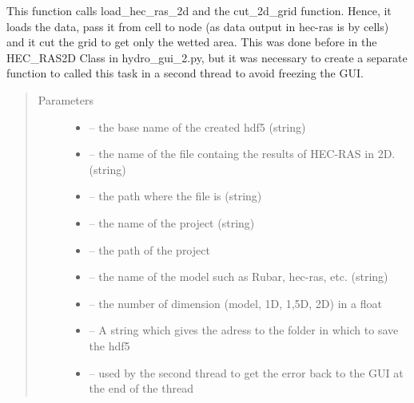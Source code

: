 \documentclass[letterpaper,10pt,english]{sphinxmanual}
\begin{document}
\begin{fulllineitems}
\label{\detokenize{index:src.hec_ras2D.load_hec_ras_2d_and_cut_grid}}
This function calls load\_hec\_ras\_2d and the cut\_2d\_grid function. Hence, it loads the data,
pass it from cell to node (as data output in hec-ras is by cells) and it cut the grid to
get only the wetted area. This was done before in the HEC\_RAS2D Class in hydro\_gui\_2.py, but it was necessary to
create a separate function to called this task in a second thread to avoid freezing the GUI.
\begin{quote}\begin{description}
\item[{Parameters}] \leavevmode\begin{itemize}
\item {} 
 -- the base name of the created hdf5 (string)

\item {} 
 -- the name of the file containg the results of HEC-RAS in 2D. (string)

\item {} 
 -- the path where the file is (string)

\item {} 
 -- the name of the project (string)

\item {} 
 -- the path of the project

\item {} 
 -- the name of the model such as Rubar, hec-ras, etc. (string)

\item {} 
 -- the number of dimension (model, 1D, 1,5D, 2D) in a float

\item {} 
 -- A string which gives the adress to the folder in which to save the hdf5

\item {} 
 -- used by the second thread to get the error back to the GUI at the end of the thread


\end{itemize}
\end{description}
\end{quote}
\end{fulllineitems}
\end{document}
